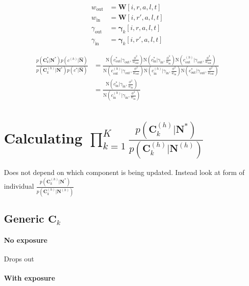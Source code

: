 \documentclass{article}
\begin{document}
\begin{align}
  w_{\text{out}} & = \bm{W}[i, r, a, l, t] \\
  w_{\text{in}} & = \bm{W}[i, r', a, l, t] \\
  \gamma_{\text{out}} & = \bm{\gamma}_k[i, r, a, l, t] \\
  \gamma_{\text{in}} & = \bm{\gamma}_k[i, r', a, l, t]
\end{align}

\begin{align}
\frac{p(\bm{C}_k^* | \bm{N}^*) p(c^{(h)} | \hat{\bm{N}})  }{p(\bm{C}_k^{(h)} | \bm{N}^*) p(c^* | \hat{\bm{N}}) } 
  & = \frac{ \text{N}\left( c_{\text{out}}^* | \gamma_{\text{out}}, \frac{\phi^2}{w_{\text{out}}} \right) \text{N}\left( c_{\text{in}}^* | \gamma_{\text{in}}, \frac{\phi^2}{w_{\text{in}}} \right) \text{N}\left( c_{\text{out}}^{(h)} | \gamma_{\text{out}}, \frac{\phi^2}{w_{\text{out}}} \right) }{ \text{N}\left( c_{\text{out}}^{(h)} | \gamma_{\text{out}}, \frac{\phi^2}{w_{\text{out}}} \right) \text{N}\left( c_{\text{in}}^{(h)} | \gamma_{\text{in}}, \frac{\phi^2}{w_{\text{in}}} \right) \text{N}\left( c_{\text{out}}^* | \gamma_{\text{out}}, \frac{\phi^2}{w_{\text{out}}} \right) } \\
  & = \frac{ \text{N}\left( c_{\text{in}}^* | \gamma_{\text{in}}, \frac{\phi^2}{w_{\text{in}}} \right) }{ \text{N}\left( c_{\text{in}}^{(h)} | \gamma_{\text{in}}, \frac{\phi^2}{w_{\text{in}}} \right) }
\end{align}


\section{Calculating $\prod_{k=1}^K \frac{ p(\bm{C}_k^{(h)} | \bm{N}^*) }{ p(\bm{C}_k^{(h)} | \bm{N}^{(h)})}$}

Does not depend on which component is being updated.  Instead look at form of individual $\frac{ p(\bm{C}_k^{(h)} | \bm{N}^*) }{ p(\bm{C}_k^{(h)} | \bm{N}^{(h)})}$


\subsection{Generic $\bm{C}_k$}

\paragraph{No exposure}

Drops out

\paragraph{With exposure}
\end{document}
